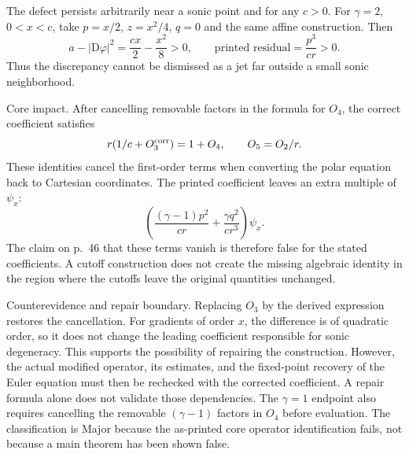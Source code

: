 \documentclass[10pt]{article}
\begin{document}
The defect persists arbitrarily near a sonic point and for any \(c>0\). For \(\gamma=2\), \(0<x<c\), take \(p=x/2\), \(z=x^2/4\), \(q=0\) and the same affine construction. Then \[a-|\mathrm D\varphi|^2=\frac{cx}{2}-\frac{x^2}{8}>0,
 \qquad \text{printed residual}=\frac{p^3}{cr}>0.\] Thus the discrepancy cannot be dismissed as a jet far outside a small sonic neighborhood.\par
Core impact. After cancelling removable factors in the formula for \(O_4\), the correct coefficient satisfies \[r(1/c+O_3^{\rm corr})=1+O_4,\qquad O_5=O_2/r.\] These identities cancel the first-order terms when converting the polar equation back to Cartesian coordinates. The printed coefficient leaves an extra multiple of \(\psi_x\): \[\left(\frac{(\gamma-1)p^2}{cr}
       +\frac{\gamma q^2}{cr^3}\right)\psi_x.\] The claim on p. 46 that these terms vanish is therefore false for the stated coefficients. A cutoff construction does not create the missing algebraic identity in the region where the cutoffs leave the original quantities unchanged.\par
Counterevidence and repair boundary. Replacing \(O_3\) by the derived expression restores the cancellation. For gradients of order \(x\), the difference is of quadratic order, so it does not change the leading coefficient responsible for sonic degeneracy. This supports the possibility of repairing the construction. However, the actual modified operator, its estimates, and the fixed-point recovery of the Euler equation must then be rechecked with the corrected coefficient. A repair formula alone does not validate those dependencies. The \(\gamma=1\) endpoint also requires cancelling the removable \((\gamma-1)\) factors in \(O_4\) before evaluation. The classification is Major because the as-printed core operator identification fails, not because a main theorem has been shown false.\par
\end{document}
